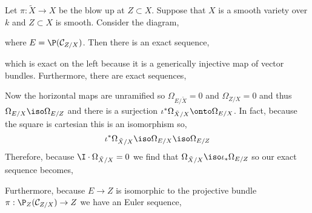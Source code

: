 \documentclass[12pt]{article}
\begin{document}
Let $\pi : \tilde{X} \to X$ be the blow up at $Z \subset X$. Suppose that $X$ is a smooth variety over $k$ and $Z \subset X$ is smooth. Consider the diagram,

\begin{center}
\end{center}
where $E = \P(\C_{Z/X})$.
Then there is an exact sequence,
\begin{center}
\end{center}
which is exact on the left because it is a generically injective map of vector bundles. Furthermore, there are exact sequences,
\begin{center}
\end{center}
Now the horizontal maps are unramified so $\Omega_{E/\tilde{X}} = 0$ and $\Omega_{Z/X} = 0$ and thus $\Omega_{E/X} \iso \Omega_{E/Z}$ and there is a surjection $\iota^* \Omega_{\tilde{X}/X} \onto \Omega_{E/X}$. In fact, because the square is cartesian this is an isomorphism so,
\[ \iota^* \Omega_{\tilde{X}/X} \iso \Omega_{E/X} \iso \Omega_{E/Z} \]
Therefore, because $\I \cdot \Omega_{\tilde{X}/X} = 0$ we find that $\Omega_{\tilde{X}/X} \iso \iota_* \Omega_{E/Z}$ so our exact sequence becomes,
\begin{center}
\end{center}
Furthermore, because $E \to Z$ is isomorphic to the projective bundle $\pi : \P_Z(\C_{Z/X}) \to Z$ we have an Euler sequence,
\begin{center}
\end{center}
\end{document}
